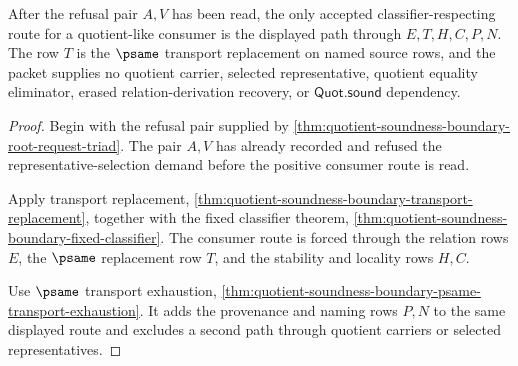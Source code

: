 \begin{theorem}
\label{thm:quotient-soundness-boundary-psame-replacement-classifier}
After the refusal pair $A,V$ has been read, the only accepted classifier-respecting route for a quotient-like consumer is the displayed path through $E,T,H,C,P,N$. The row $T$ is the $\psame$ transport replacement on named source rows, and the packet supplies no quotient carrier, selected representative, quotient equality eliminator, erased relation-derivation recovery, or $\mathsf{Quot.sound}$ dependency.
\end{theorem}
\begin{proof}
Begin with the refusal pair supplied by \autoref{thm:quotient-soundness-boundary-root-request-triad}. The pair $A,V$ has already recorded and refused the representative-selection demand before the positive consumer route is read.

Apply transport replacement, \autoref{thm:quotient-soundness-boundary-transport-replacement}, together with the fixed classifier theorem, \autoref{thm:quotient-soundness-boundary-fixed-classifier}. The consumer route is forced through the relation rows $E$, the $\psame$ replacement row $T$, and the stability and locality rows $H,C$.

Use $\psame$ transport exhaustion, \autoref{thm:quotient-soundness-boundary-psame-transport-exhaustion}. It adds the provenance and naming rows $P,N$ to the same displayed route and excludes a second path through quotient carriers or selected representatives.
\end{proof}

